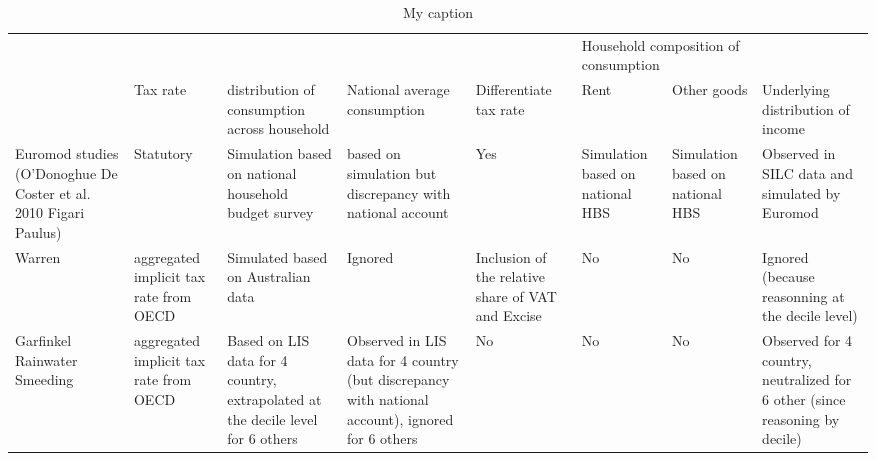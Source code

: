 \begin{table}[]
\centering
\caption{My caption}
\label{my-label}
\begin{tabular}{llllllll}
                                                                  &                                        &                                                                                &                                                                                                  &                                                   & \multicolumn{2}{l}{Household composition of consumption}                    &                                                                             \\
                                                                  & Tax rate                               & distribution of consumption across household                                   & National average consumption                                                                     & Differentiate tax rate                            & Rent                                     & Other goods                      & Underlying distribution of income                                           \\
Euromod studies (O'Donoghue De Coster et al. 2010  Figari Paulus) & Statutory                              & Simulation based on national household budget survey                           & based on simulation but discrepancy with national account                                        & Yes                                               & Simulation based on national HBS         & Simulation based on national HBS & Observed in SILC data and simulated by Euromod                              \\
Warren                                                            & aggregated implicit tax rate from OECD & Simulated based on Australian data                                             & Ignored                                                                                          & Inclusion of the relative share of VAT and Excise & No                                       & No                               & Ignored (because reasonning at the decile level)                            \\
Garfinkel Rainwater Smeeding                                      & aggregated implicit tax rate from OECD & Based on LIS data for 4 country, extrapolated at the decile level for 6 others & Observed in LIS data for 4 country (but discrepancy with national account), ignored for 6 others & No                                                & No                                       & No                               & Observed for 4 country, neutralized for 6 other (since reasoning by decile) \\

\end{tabular}
\end{table}
